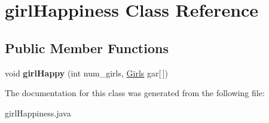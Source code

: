 \hypertarget{classgirl_happiness}{}\section{girl\+Happiness Class Reference}
\label{classgirl_happiness}
\subsection*{Public Member Functions}
\begin{DoxyCompactItemize}
\item 
\mbox{\label{classgirl_happiness_aec45d47f570ee2420f2141d1b0c0febe}} 
void {\bfseries girl\+Happy} (int num\+\_\+girls, \hyperlink{class_girls}{Girls} gar\mbox{[}$\,$\mbox{]})
\end{DoxyCompactItemize}


The documentation for this class was generated from the following file\+:\begin{DoxyCompactItemize}
\item 
girl\+Happiness.\+java\end{DoxyCompactItemize}
